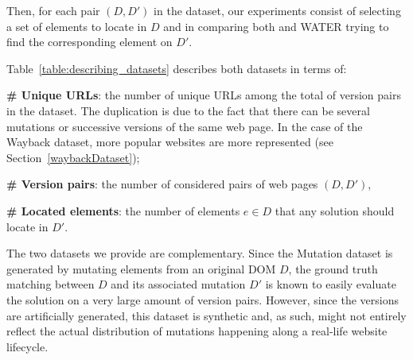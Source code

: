 Then, for each pair $(D, D')$ in the dataset, our experiments consist of selecting a set of elements to locate in $D$ and in comparing both \erratum{} and WATER trying to find the corresponding element on $D'$.

Table~\ref{table:describing_datasets} describes both datasets in terms of:
\begin{compactenum}
    \item \textbf{\# Unique URLs}: the number of unique URLs among the total of version pairs in the dataset. The duplication is due to the fact that there can be several mutations or successive versions of the same web page. In the case of the {\sc Wayback} dataset, more popular websites are more represented (see Section~\ref{waybackDataset});
    \item \textbf{\# Version pairs}: the number of considered pairs of web pages $(D, D')$,
    \item \textbf{\# Located elements}: the number of elements $e \in D$ that any solution should locate in $D'$.
\end{compactenum}

\begin{table}[!htbp]
    \caption{Description of the \textsc{Mutation} \& \textsc{Wayback} datasets.}
    \label{table:describing_datasets}
    \centering
\end{table}

The two datasets we provide are complementary. 
Since the {\sc Mutation} dataset is generated by mutating elements from an original DOM $D$, the ground truth matching between $D$ and its associated mutation $D'$ is known to easily evaluate the solution on a very large amount of version pairs. 
However, since the versions are artificially generated, this dataset is synthetic and, as such, might not entirely reflect the actual distribution of mutations happening along a real-life website lifecycle.

